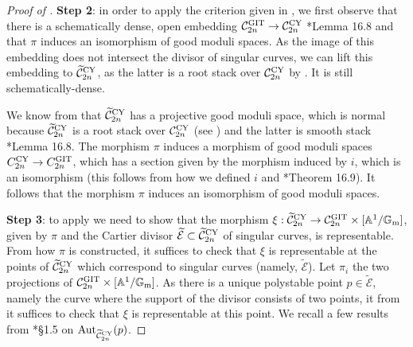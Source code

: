 \documentclass{amsart}
\newcommand{\bA}{\mathbb{A}}
\newcommand{\bG}{\mathbb{G}}
\newcommand{\cC}{\mathcal{C}}
\newcommand{\cE}{\mathcal{E}}
\newcommand{\Gm}{\bG_{{\rm m}}}
\newcommand{\Aut}{\operatorname{Aut}}
\newcommand{\Ctilde}{\widetilde{\mathcal{C}}}
\newcommand{\git}{{\rm GIT}}
\newcommand{\CY}{{\rm CY}}
\theoremstyle{definition}
\theoremstyle{definition}
\begin{document}
{\begin{proof}[Proof of ]
    \noindent
    \textbf{Step 2}: in order to apply the criterion given in , we first observe that there is a schematically dense, open embedding $\cC^{\git}_{2n}\to \cC^{\CY}_{2n}$ \cite{ascher2023moduli}*{Lemma 16.8} and that $\pi$ induces an isomorphism of good moduli spaces. As the image of this embedding does not intersect the divisor of singular curves, we can lift this embedding to $\Ctilde_{2n}^{\CY}$, as the latter is a root stack over $\cC^{\CY}_{2n}$ by . It is still schematically-dense.

    We know from  that $\Ctilde^{\CY}_{2n}$ has a projective good moduli space, which is normal because $\Ctilde^{\CY}_{2n}$ is a root stack over $\cC^{\CY}_{2n}$ (see ) and the latter is smooth stack \cite{ascher2023moduli}*{Lemma 16.8}. The morphism $\pi$ induces a morphism of good moduli spaces $C_{2n}^{\CY}\to C_{2n}^{\git}$, which has a section given by the morphism induced by $i$, which is an isomorphism (this follows from how we defined $i$ and \cite{ascher2023moduli}*{Theorem 16.9}). It follows that the morphism $\pi$ induces an isomorphism of good moduli spaces.

    \noindent
    \textbf{Step 3}: to apply  we need to show that the morphism $\xi:\Ctilde^{\CY}_{2n} \to \cC^{\git}_{2n}\times [\bA^1/\Gm]$, given by $\pi$ and the Cartier divisor $\widetilde{\cE}\subset \Ctilde^{\CY}_{2n}$ of singular curves, is representable. From how $\pi$ is constructed, it suffices to check that $\xi$ is representable at the points of $\widetilde{\cC}_{2n}^\CY$ which correspond to singular curves (namely, $\widetilde{\cE}$). Let $\pi_i$ the two projections of $\cC^{\git}_{2n}\times [\bA^1/\Gm]$. As there is a unique polystable point $p\in \widetilde{\cE}$, namely the curve where the support of the divisor consists of two points, it from  it suffices to check that $\xi$ is representable at this point. We recall a few results from \cite{DLV}*{\S 1.5} on $\Aut_{\Ctilde^{\CY}_{2n}}(p)$.
    

\end{proof}}
\end{document}
